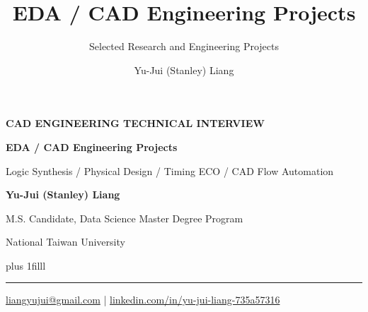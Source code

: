 \documentclass[aspectratio=169,10pt]{beamer}
\title[CAD Technical Interview]{EDA / CAD Engineering Projects}
\subtitle{Selected Research and Engineering Projects}
\author{Yu-Jui (Stanley) Liang}
\institute{National Taiwan University}
\date{}
\newcommand{\smalllabel}[1]{{\scriptsize\bfseries\color{Accent}\MakeUppercase{#1}}}
\newcommand{\slidenavigation}{}
\newcommand{\slideposition}{}
\begin{document}


{
\renewcommand{\slidenavigation}{\hyperlink{details-index}{\beamerbutton{Details index}}}
\renewcommand{\slideposition}{Summary 1 / 18}
\begin{frame}[plain,label=summary-1]
  \vspace*{1.65cm}
  \smalllabel{CAD Engineering Technical Interview}\par
  \vspace{0.51cm}
  {\raggedright\fontsize{21}{27}\selectfont\bfseries\color{Ink}
    EDA / CAD Engineering Projects\par}
  \vspace{0.29cm}
  {\normalsize\color{Muted}Logic Synthesis \enspace / \enspace Physical Design \enspace / \enspace Timing ECO \enspace / \enspace CAD Flow Automation\par}
  \vspace{0.70cm}
  {\Large\bfseries\color{Ink}Yu-Jui (Stanley) Liang}\par
  \vspace{0.10cm}
  {\normalsize\color{Muted}M.S. Candidate, Data Science Master Degree Program\par}
  {\normalsize\color{Muted}National Taiwan University\par}
  \vskip0pt plus 1filll
  {\color{Accent}\rule{\textwidth}{0.7pt}}\par
  \vspace{0.16cm}
  {\small\href{mailto:liangyujui@gmail.com}{liangyujui@gmail.com}
     \quad | \quad
     \href{https://www.linkedin.com/in/yu-jui-liang-735a57316}{linkedin.com/in/yu-jui-liang-735a57316}\par}
  \vspace*{0.55cm}
\end{frame}}
\end{document}
